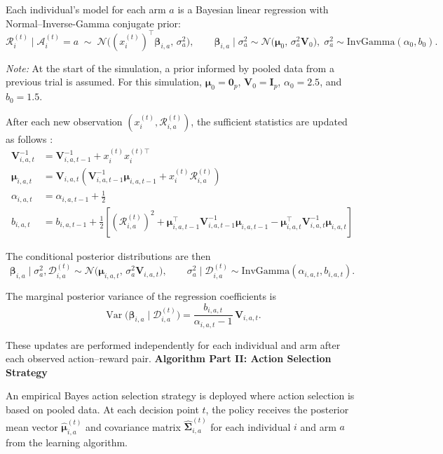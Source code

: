 \documentclass[letterpaper, 11pt]{extarticle}
\begin{document}
Each individual's model for each arm $a$ is a Bayesian linear regression with Normal–Inverse-Gamma conjugate prior:
\[
\mathcal{R}_{i}^{(t)} \mid \mathcal{A}_i^{(t)}=a 
\;\sim\; \mathcal{N}\!\big((x_{i}^{(t)})^\top \boldsymbol{\beta}_{i,a},\, \sigma_a^{2}\big),
\qquad
\boldsymbol{\beta}_{i,a} \mid \sigma_a^{2} \sim 
\mathcal{N}\!\big(\boldsymbol{\mu}_{0},\, \sigma_a^{2} \mathbf{V}_{0}\big),\;
\sigma_a^{2}\sim \mathrm{InvGamma}(\alpha_{0},b_{0}).
\]

\textit{Note:} At the start of the simulation, a prior informed by pooled data from a previous trial is assumed.  For this simulation,
$\boldsymbol{\mu}_{0}=\mathbf{0}_p$, $\mathbf{V}_{0}=\mathbf{I}_p$, $\alpha_{0}=2.5$, and $b_{0}=1.5$.

After each new observation $(x_{i}^{(t)},\mathcal{R}_{i,a}^{(t)})$,
the sufficient statistics are updated as follows \cite{murphy2007conjugate}:
\begin{align*}
\mathbf{V}_{i,a,t}^{-1} &= \mathbf{V}_{i,a,t-1}^{-1} + x_{i}^{(t)} x_{i}^{(t)\top} \\[2pt]
\boldsymbol{\mu}_{i,a,t} &= 
\mathbf{V}_{i,a,t}\!\left(\mathbf{V}_{i,a,t-1}^{-1}\boldsymbol{\mu}_{i,a,t-1}
      + x_{i}^{(t)} \mathcal{R}_{i,a}^{(t)}\right) \\[2pt]
\alpha_{i,a,t} &= \alpha_{i,a,t-1} + \tfrac{1}{2} \\[2pt]
b_{i,a,t} &= b_{i,a,t-1}
+ \tfrac{1}{2}\!\left[(\mathcal{R}_{i,a}^{(t)})^{2}
+ \boldsymbol{\mu}_{i,a,t-1}^\top \mathbf{V}_{i,a,t-1}^{-1}\boldsymbol{\mu}_{i,a,t-1}
- \boldsymbol{\mu}_{i,a,t}^\top \mathbf{V}_{i,a,t}^{-1}\boldsymbol{\mu}_{i,a,t}\right]
\end{align*}

The conditional posterior distributions are then
\[
\boldsymbol{\beta}_{i,a} \mid \sigma_a^{2},\mathcal{D}_{i,a}^{(t)} 
\sim \mathcal{N}\!\big(\boldsymbol{\mu}_{i,a,t},\, \sigma_a^{2}\mathbf{V}_{i,a,t}\big),
\qquad
\sigma_a^{2}\mid \mathcal{D}_{i,a}^{(t)} 
\sim \mathrm{InvGamma}(\alpha_{i,a,t}, b_{i,a,t}).
\]

The marginal posterior variance of the regression coefficients is
\[
\operatorname{Var}\!\big(\boldsymbol{\beta}_{i,a}\mid \mathcal{D}_{i,a}^{(t)}\big)
= \frac{b_{i,a,t}}{\alpha_{i,a,t}-1}\,\mathbf{V}_{i,a,t}.
\]

These updates are performed independently for each individual and arm after each observed action–reward pair.
\newpage
\textsf{\textbf{Algorithm Part II: Action Selection Strategy}}

An empirical Bayes action selection strategy is deployed where action selection is based on pooled data. 
At each decision point $t$, the policy receives the posterior mean vector 
$\hat{\boldsymbol{\mu}}_{i,a}^{(t)}$ and covariance matrix $\hat{\boldsymbol{\Sigma}}_{i,a}^{(t)}$ 
for each individual $i$ and arm $a$ from the learning algorithm.
\end{document}
